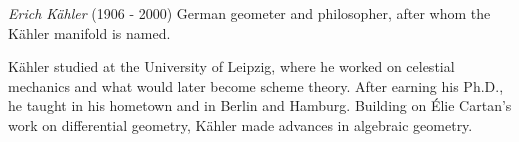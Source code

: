 \documentclass[12pt]{article}
\begin{document}
\emph{Erich K\"ahler} (1906 - 2000) German geometer and philosopher, after whom the K\"ahler manifold is named.

K\"ahler studied at the University of Leipzig, where he worked on celestial mechanics and what would later become scheme theory. After earning his Ph.D., he taught in his hometown and in Berlin and Hamburg. Building on \'Elie Cartan's work on differential geometry, K\"ahler made advances in algebraic geometry.
\end{document}
